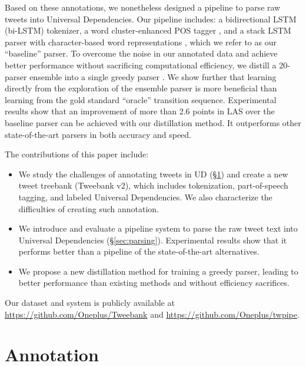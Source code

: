 \documentclass[11pt,a4paper]{article}
\newcommand{\yicomment}[1]{\textcolor{gray}{[#1 ---\textsc{yi}]}}
\begin{document}
Based on these annotations, we nonetheless designed a pipeline to parse 
raw tweets into Universal Dependencies. Our pipeline includes: a
bidirectional LSTM (bi-LSTM) tokenizer, a word cluster-enhanced POS
tagger \citep[following][]{owoputi-EtAl:2013:NAACL-HLT}, and a stack LSTM parser
with character-based word representations
\cite{ballesteros-dyer-smith:2015:EMNLP}, which we refer to as our
``baseline'' parser.
To overcome the noise in our annotated data and achieve better performance
without sacrificing computational efficiency, we 
distill a 20-parser ensemble into a single greedy  parser 
\cite{DBLP:journals/corr/HintonVD15}.
We show further  that learning directly from the exploration of the ensemble parser
is more beneficial than learning from the gold standard ``oracle''
transition sequence. Experimental results show that an improvement of more
than 2.6 points in LAS over the
baseline parser can be achieved with our distillation method.  It outperforms
other state-of-the-art parsers in both accuracy and speed.

The contributions of this paper include:
\begin{itemize}
\item We study the challenges of annotating tweets in UD (\S\ref{sec:anno})
and create a new tweet treebank ({\sc Tweebank v2}), which includes 
tokenization, part-of-speech tagging, and labeled Universal Dependencies.
We also characterize the difficulties of creating such annotation.

\item We introduce and evaluate a pipeline system to parse the raw tweet text into
Universal Dependencies (\S\ref{sec:parsing}).  Experimental results show
that it performs better than a pipeline of the state-of-the-art alternatives.

\item We propose a new distillation
method for training a greedy parser, leading to better performance
than existing methods and without efficiency sacrifices.
\end{itemize}

Our dataset and system is publicly available at \url{https://github.com/Oneplus/Tweebank}
and \url{https://github.com/Oneplus/twpipe}.


\section{Annotation}\label{sec:anno}
\end{document}
